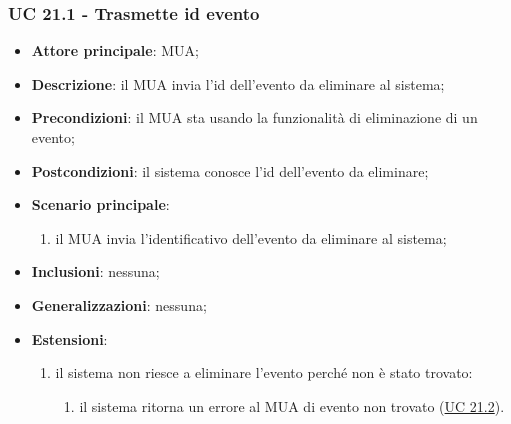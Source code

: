 \subsubsection{UC 21.1 - Trasmette id evento} \label{sec:UC21.1}
    \begin{itemize}
        \item \textbf{Attore principale}: MUA;
        \item \textbf{Descrizione}:  il MUA invia l'id dell'evento da eliminare al sistema;
        \item \textbf{Precondizioni}: il MUA sta usando la funzionalità di eliminazione di un evento;
        \item \textbf{Postcondizioni}:  il sistema conosce l'id dell'evento da eliminare;
        \item \textbf{Scenario principale}:
            \begin{enumerate}
                \item il MUA invia l'identificativo dell'evento da eliminare al sistema;
            \end{enumerate}
        \item \textbf{Inclusioni}: nessuna;
        \item \textbf{Generalizzazioni}: nessuna;
        \item \textbf{Estensioni}:
            \begin{enumerate}[label=\alph*.]
                \item il sistema non riesce a eliminare l'evento perché non è stato trovato:
                \begin{enumerate}[label=\arabic*.]
                    \item il sistema ritorna un errore al MUA di evento non trovato (\hyperref[sec:UC21.2]{UC 21.2}).
                \end{enumerate}
            \end{enumerate}
    \end{itemize}


